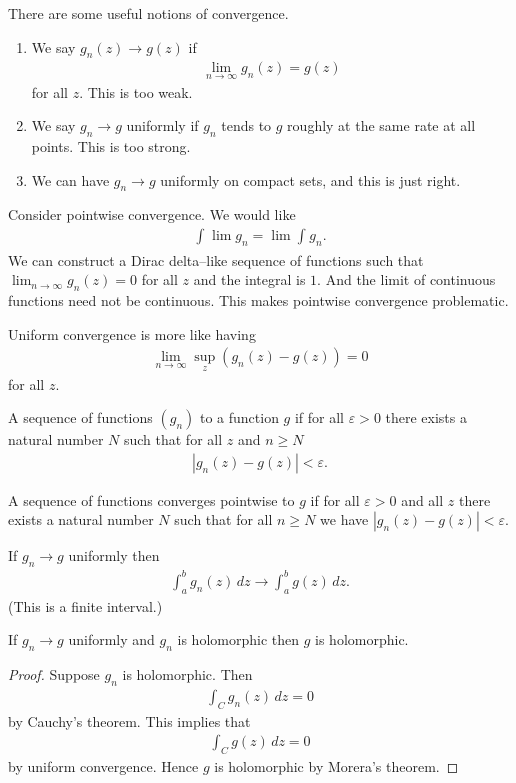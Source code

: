 \documentclass[11pt, oneside,margin=1in]{article}
\begin{document}
There are some useful notions of convergence.
\begin{enumerate}
	\item We say $g_n(z)\to g (z)$  if
		\begin{align*}
			\lim_{n\to\infty} g_n(z) = g (z)
		\end{align*}
		for all $z$. This is too weak.
	\item We say $g_n\to g$ uniformly if $g_n$ tends to $g$ roughly at the same rate at all points. This is too strong.
	\item We can have $g_n\to g$ uniformly on compact sets, and this is just right.
\end{enumerate}

Consider pointwise convergence. We would like
\begin{align*}
	\int_{}^{} \lim g_n = \lim \int_{}^{} g_n. 
\end{align*}
We can construct a Dirac delta--like sequence of functions such that $\lim_{n\to\infty}g_n(z) =0$ for all $z$ and the integral is $1$. And the limit of continuous functions need not be continuous. This makes pointwise convergence problematic.

Uniform convergence is more like having 
\begin{align*}
	\lim_{n\to\infty} \sup_z (g_n(z)-g (z)) =0
\end{align*}
for all $z$.
\begin{definition}\label{}\text{}
A sequence of functions $(g_n)$  to a function $g$ if for all $\varepsilon > 0$ there exists a natural number $N$ such that for all $z$ and $n\ge N$
\begin{align*}
 \left\lvert g_n(z) - g (z) \right\rvert <\varepsilon.
\end{align*}
\end{definition}

A sequence of functions converges pointwise to $g$ if for all $\varepsilon >0$ and all $z$ there exists a natural number $N$ such that for all $n\ge N$ we have $\left\lvert g_n(z) -g(z)\right\rvert <\varepsilon$.

\begin{remark}
	If $g_n\to g$ uniformly then 
	\begin{align*}
		\int_{a}^{b} g_n(z)  \, dz \longrightarrow \int_{a}^{b} g(z)  \, dz.  
	\end{align*}
	(This is a finite interval.)
\end{remark}
\begin{remark}
	If $g_n\to g$ uniformly and $g_n$ is holomorphic then $g$ is holomorphic.
\end{remark}
\begin{proof}
Suppose $g_n$ is holomorphic. Then 
\begin{align*}
	\int_{C}^{} g_n(z)  \, d z = 0
\end{align*}
by Cauchy's theorem. This implies that 
\begin{align*}
	\int_{C}^{} g(z)  \, dz =0
\end{align*}
by uniform convergence. Hence $g$ is holomorphic by Morera's theorem.
\end{proof}
\end{document}
